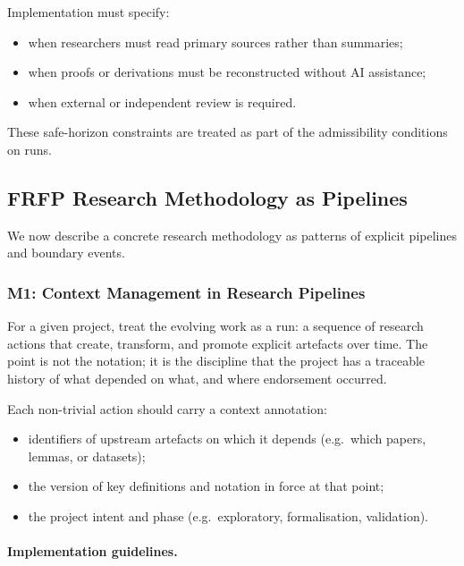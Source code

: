 Implementation must specify:

\begin{itemize}
  \item when researchers must read primary sources rather than summaries;
  \item when proofs or derivations must be reconstructed without AI assistance;
  \item when external or independent review is required.
\end{itemize}

These safe-horizon constraints are treated as part of the admissibility
conditions on runs.

\subsection{FRFP Research Methodology as Pipelines}
\label{sec:frfp-methodology-research}

We now describe a concrete research methodology as patterns of explicit
pipelines and boundary events.

\subsubsection*{M1: Context Management in Research Pipelines}

For a given project, treat the evolving work as a run: a sequence of research actions that create,
transform, and promote explicit artefacts over time. The point is not the notation; it is the discipline
that the project has a traceable history of what depended on what, and where endorsement occurred.


Each non-trivial action should carry a context annotation:

\begin{itemize}
  \item identifiers of upstream artefacts on which it depends
        (e.g.\ which papers, lemmas, or datasets);
  \item the version of key definitions and notation in force at that point;
  \item the project intent and phase (e.g.\ exploratory, formalisation,
        validation).
\end{itemize}

\paragraph{Implementation guidelines.}

